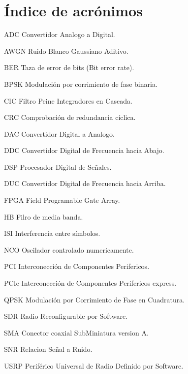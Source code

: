 \chapter*{\'Indice de acr\'onimos}
%

\begin{symbollist*}

\item[ADC]  Convertidor Analogo a Digital.
\item[AWGN] Ruido Blanco Gaussiano Aditivo.
\item[BER]  Taza de error de bits (Bit error rate).
\item[BPSK] Modulaci\'on por corrimiento de fase binaria.
\item[CIC]  Filtro Peine Integradores en Cascada.
\item[CRC]  Comprobaci\'on de redundancia c\'iclica.
\item[DAC]  Convertidor Digital a Analogo.
\item[DDC]  Convertidor Digital de Frecuencia hacia Abajo.
\item[DSP]  Procesador Digital de Se\~nales.
\item[DUC]  Convertidor Digital de Frecuencia hacia Arriba.
\item[FPGA] Field Programable Gate Array.
\item[HB]   Filro de media banda.
\item[ISI]  Interferencia entre s\'imbolos.
\item[NCO]  Oscilador controlado numericamente.
\item[PCI]  Interconecci\'on de Componentes Perifericos.
\item[PCIe] Interconecci\'on de Componentes Perifericos express.
\item[QPSK] Modulaci\'on por Corrimiento de Fase en Cuadratura.
\item[SDR]  Radio Reconfigurable por Software.
\item[SMA]  Conector coaxial SubMiniatura version A.
\item[SNR]  Relacion Se\~nal a Ruido.
\item[USRP] Perif\'erico Universal de Radio Definido por Software.

\end{symbollist*}
